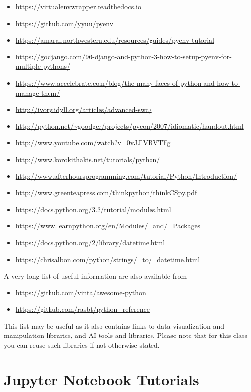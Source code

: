 \begin{itemize}
\tightlist
\item
  \url{https://virtualenvwrapper.readthedocs.io}
\item
  \url{https://github.com/yyuu/pyenv}
\item
  \url{https://amaral.northwestern.edu/resources/guides/pyenv-tutorial}
\item
  \url{https://godjango.com/96-django-and-python-3-how-to-setup-pyenv-for-multiple-pythons/}
\item
  \url{https://www.accelebrate.com/blog/the-many-faces-of-python-and-how-to-manage-them/}
\item
  \url{http://ivory.idyll.org/articles/advanced-swc/}
\item
  \url{http://python.net/~goodger/projects/pycon/2007/idiomatic/handout.html}
\item
  \url{http://www.youtube.com/watch?v=0vJJlVBVTFg}
\item
  \url{http://www.korokithakis.net/tutorials/python/}
\item
  \url{http://www.afterhoursprogramming.com/tutorial/Python/Introduction/}
\item
  \url{http://www.greenteapress.com/thinkpython/thinkCSpy.pdf}
\item
  \url{https://docs.python.org/3.3/tutorial/modules.html}
\item
  \url{https://www.learnpython.org/en/Modules/_and/_Packages}
\item
  \url{https://docs.python.org/2/library/datetime.html}
\item
  \url{https://chrisalbon.com/python/strings/_to/_datetime.html}
\end{itemize}

A very long list of useful information are also available from

\begin{itemize}
\tightlist
\item
  \url{https://github.com/vinta/awesome-python}
\item
  \url{https://github.com/rasbt/python_reference}
\end{itemize}

This list may be useful as it also contains links to data visualization
and manipulation libraries, and AI tools and libraries. Please note that
for this class you can reuse such libraries if not otherwise stated.

\section{Jupyter Notebook Tutorials}\label{jupyter-notebook-tutorials}

